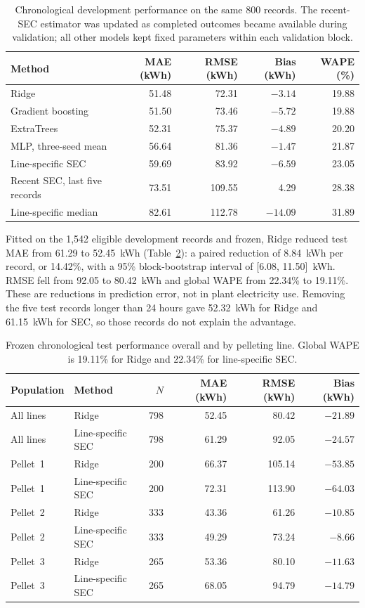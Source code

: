 \begin{table}[!htbp]\centering\small\setlength{\tabcolsep}{5pt}
\caption{Chronological development performance on the same 800 records. The recent-SEC estimator was updated as completed outcomes became available during validation; all other models kept fixed parameters within each validation block.}\label{tab:development}
\begin{tabular}{@{}lrrrr@{}}\toprule
Method & MAE (kWh) & RMSE (kWh) & Bias (kWh) & WAPE (\%) \\\midrule
Ridge & 51.48 & 72.31 & $-3.14$ & 19.88 \\
Gradient boosting & 51.50 & 73.46 & $-5.72$ & 19.88 \\
ExtraTrees & 52.31 & 75.37 & $-4.89$ & 20.20 \\
MLP, three-seed mean & 56.64 & 81.36 & $-1.47$ & 21.87 \\
Line-specific SEC & 59.69 & 83.92 & $-6.59$ & 23.05 \\
Recent SEC, last five records & 73.51 & 109.55 & 4.29 & 28.38 \\
Line-specific median & 82.61 & 112.78 & $-14.09$ & 31.89 \\\bottomrule
\end{tabular}
\end{table}

Fitted on the 1,542 eligible development records and frozen, Ridge reduced test MAE from 61.29 to 52.45~kWh (Table~\ref{tab:test}): a paired reduction of 8.84~kWh per record, or 14.42\%, with a 95\% block-bootstrap interval of [6.08, 11.50]~kWh. RMSE fell from 92.05 to 80.42~kWh and global WAPE from 22.34\% to 19.11\%. These are reductions in prediction error, not in plant electricity use. Removing the five test records longer than 24 hours gave 52.32~kWh for Ridge and 61.15~kWh for SEC, so those records do not explain the advantage.

\begin{table}[!htbp]\centering\small
\caption{Frozen chronological test performance overall and by pelleting line. Global WAPE is 19.11\% for Ridge and 22.34\% for line-specific SEC.}\label{tab:test}
\begin{tabular}{@{}llrrrr@{}}\toprule
Population & Method & $N$ & MAE (kWh) & RMSE (kWh) & Bias (kWh) \\\midrule
All lines & Ridge & 798 & 52.45 & 80.42 & $-21.89$ \\
All lines & Line-specific SEC & 798 & 61.29 & 92.05 & $-24.57$ \\\addlinespace
Pellet~1 & Ridge & 200 & 66.37 & 105.14 & $-53.85$ \\
Pellet~1 & Line-specific SEC & 200 & 72.31 & 113.90 & $-64.03$ \\
Pellet~2 & Ridge & 333 & 43.36 & 61.26 & $-10.85$ \\
Pellet~2 & Line-specific SEC & 333 & 49.29 & 73.24 & $-8.66$ \\
Pellet~3 & Ridge & 265 & 53.36 & 80.10 & $-11.63$ \\
Pellet~3 & Line-specific SEC & 265 & 68.05 & 94.79 & $-14.79$ \\\bottomrule
\end{tabular}
\end{table}


